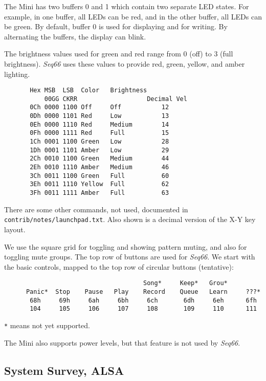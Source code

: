    The Mini has two buffers 0 and 1 which contain two separate LED states. For
   example, in one buffer, all LEDs can be red, and in the other buffer, all LEDs
   can be green.  By default, buffer 0 is used for displaying and for writing.
   By alternating the buffers, the display can blink.

   The brightness values used for green and red range from 0 (off) to 3 (full
   brightness).  \textsl{Seq66} uses these values to provide red, green, yellow,
   and amber lighting.

   \begin{verbatim}
       Hex MSB  LSB  Color   Brightness
           00GG CKRR                   Decimal Vel
       0Ch 0000 1100 Off     Off           12
       0Dh 0000 1101 Red     Low           13
       0Eh 0000 1110 Red     Medium        14
       0Fh 0000 1111 Red     Full          15
       1Ch 0001 1100 Green   Low           28
       1Dh 0001 1101 Amber   Low           29
       2Ch 0010 1100 Green   Medium        44
       2Eh 0010 1110 Amber   Medium        46
       3Ch 0011 1100 Green   Full          60
       3Eh 0011 1110 Yellow  Full          62
       3Fh 0011 1111 Amber   Full          63
   \end{verbatim}

   There are some other commands, not used, documented in
   \texttt{contrib/notes/launchpad.txt}.
   Also shown is a decimal version of the X-Y key layout.

   We use the square grid for toggling and showing pattern muting, and also for
   toggling mute groups.
   The top row of buttons are used for \textsl{Seq66}. We start with the basic
   controls, mapped to the top row of circular buttons (tentative):

   \begin{verbatim}
                                      Song*     Keep*   Grou*
      Panic*  Stop    Pause   Play    Record    Queue   Learn     ???*
       68h     69h     6ah     6bh     6ch       6dh     6eh      6fh
       104     105     106     107     108       109     110      111
   \end{verbatim}

   \texttt{*} means not yet supported.

   The Mini also supports power levels, but that feature is not used by
   \textsl{Seq66}.

\subsection{System Survey, ALSA}
\label{subsec:launchpad_mini_survey_alsa}

